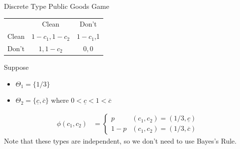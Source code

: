 \documentclass[10pt]{extarticle}
\begin{document}
  \begin{problem}{Discrete Type Public Goods Game}
    \begin{center}
      \renewcommand{\arraystretch}{1.5}
      \begin{tabular}{c|c|c|}
        \multicolumn{1}{c}{} & \multicolumn{1}{c}{Clean} & \multicolumn{1}{c}{Don't}\\
        \cline{2-3}
        Clean & $1-c_1,1-c_2$ & $1-c_1$,1\\
        \cline{2-3}
        Don't & $1,1-c_2$ & $0,0$\\
        \cline{2-3}
      \end{tabular}
    \end{center}
    Suppose
    \begin{itemize}
      \item $\Theta_1 = \{1/3\}$ 
      \item $\Theta_2 = \{\underline{c}, \overline{c}\}$ where $0 < \underline{c} < 1 < \overline{c}$
    \end{itemize}
    \begin{align*}
      \phi(c_1,c_2) &= \begin{cases}
        p&(c_1,c_2) = (1/3, \underline{c})\\
        1-p & (c_1,c_2) = (1/3, \overline{c})
      \end{cases}\tag*{$p < 1/2$}
    \end{align*}
    Note that these types are independent, so we don't need to use Bayes's Rule.\\


\end{problem}
\end{document}
